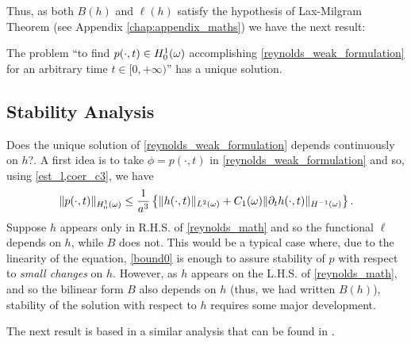 Thus, as both $B(h)$ and $\ell(h)$ satisfy the hypothesis of Lax-Milgram Theorem (see Appendix \ref{chap:appendix_maths}) we have the next result:
\begin{theorem}
The problem ``to find $p(\cdot,t)\in{H_0^1(\omega)}$ accomplishing \eqref{reynolds_weak_formulation} for an arbitrary time $t\in [0,+\infty)$'' has a unique solution. 
\end{theorem}

\subsection{Stability Analysis}
Does the unique solution of \eqref{reynolds_weak_formulation} depends continuously on $h$?. A first idea is to take $\phi=p(\cdot,t)$ in \eqref{reynolds_weak_formulation} and so, using \eqref{est_l,coer_c3}, we have
\begin{equation}
\|p(\cdot,t)\|_\hzerooneom\leq \frac{1}{a^3}\left\{\|h(\cdot,t)\|_\lpom{2}+C_1(\omega)\|\partial_t h(\cdot,t)\|_{H^{-1}(\omega)}\right\}.\label{eq:bound0}
\end{equation}
Suppose $h$ appears only in R.H.S. of \eqref{reynolds_math} and so the functional $\ell$ depends on $h$, while $B$ does not. This would be a typical case where, due to the linearity of the equation, \eqref*{bound0} is enough to assure stability of $p$ with respect to \emph{small changes} on $h$. However, as $h$ appears on the L.H.S. of \eqref{reynolds_math}, and so the bilinear form $B$ also depends on $h$ (thus, we had written $B(h)$), stability of the solution with respect to $h$ requires some major development.

The next result is based in a similar analysis that can be found in \cite{bonito2013}.

